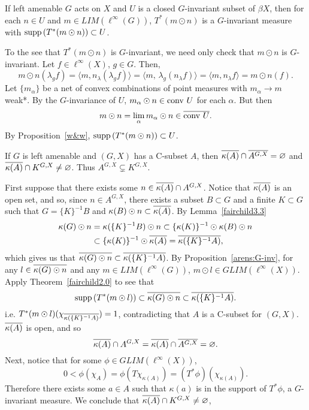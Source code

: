 \begin{theorem}\label{fairchild2.0}
If left amenable $G$ acts on $X$ and $U$ is a closed $G$-invariant
subset of $\beta X$, then for each $n\in U$ and $m\in LIM(\ell^\infty(G))$, $T^*(m\odot n)$
is a $G$-invariant measure with $\operatorname{supp\,} (T^*(m\odot n)) \subset U$.
\end{theorem}
\proof
To the see that $T^*(m\odot n)$ is $G$-invariant, we need only check that $m\odot n$ is
$G$-invariant.  Let $f\in \ell^\infty (X)$, $g\in G$.  Then,
\[
m\odot n(\lambda_g f) = \langle m, n_\lambda (\lambda_g f) \rangle = \langle m,\,\lambda_g(n_\lambda f) \rangle
= \langle m, n_\lambda f \rangle = m\odot n(f).
\]
Let $\{m_\alpha\}$ be a net of convex combinations of point measures with $m_\alpha \rightarrow m$ weak*.
By the $G$-invariance of $U$, $m_\alpha \odot n \in \operatorname{conv\,} U$ for each $\alpha$.  But then
\[
m\odot n = \lim_\alpha m_\alpha \odot n \in \overline{\operatorname{conv\,} U}.
\]
By Proposition~\ref{w&w}, $\operatorname{supp\,}(T^*(m\odot n)) \subset U$.
\done

\begin{theorem}
If $G$ is left amenable and $(G,X)$ has a C-subset $A$, then $\overline{\kappa(A)}\cap\overline{A^{G,X}} = \varnothing$ and
$\overline{\kappa(A)}\cap K^{G,X} \neq \varnothing$.  Thus $A^{G,X} \subsetneq K^{G,X}$.
\end{theorem}
\proof
First suppose that there exists some $n \in \overline{\kappa(A)}\cap A^{G,X}$.  Notice that $\overline{\kappa(A)}$
is an open set, and so, since $n\in A^{G,X}$, there exists a subset $B\subset G$ and a
finite $K\subset G$ such that $G=\{K\}^{-1}B$ and $\kappa(B) \odot n \subset \overline{\kappa(A)}$.
By Lemma~\ref{fairchild3.3}
\begin{align*}
\kappa(G) \odot n &= \kappa(\{K\}^{-1}B) \odot n \subset \{\kappa(K)\}^{-1} \odot \kappa(B) \odot n\\
& \subset \{\kappa(K)\}^{-1} \odot \overline{\kappa(A)} = \overline{\kappa(\{K\}^{-1}A)},
\end{align*}
which gives us that $\overline{\kappa(G) \odot n} \subset \overline{\kappa(\{K\}^{-1}A)}$.
By Proposition~\ref{arens:G-inv}, for any  $l\in \overline{\kappa(G) \odot n}$ and any $m\in LIM(\ell^\infty(G))$,
$m\odot l \in GLIM(\ell^\infty(X))$.
Apply Theorem~\ref{fairchild2.0} to see that 
\[
\operatorname{supp\,}(T^*(m\odot l)) \subset \overline{\kappa(G) \odot n} \subset \overline{\kappa(\{K\}^{-1}A)}.
\]
i.e. $T^*(m\odot l) (\chi_{\overline{\kappa(\{K\}^{-1}A)}}) = 1$, contradicting that
$A$ is a C-subset for $(G,X)$.  $\overline{\kappa(A)}$ is open, and so
\[
\overline{\kappa(A)} \cap A^{G,X} = \overline{\kappa(A)} \cap \overline{A^{G,X}} = \varnothing.
\]
Next, notice that for some $\phi \in GLIM(\ell^\infty(X))$,
\[
0 < \phi(\chi_A) = \phi (T \chi_{\kappa(A)}) = (T^*\phi)(\chi_{\kappa(A)}).
\]
Therefore there exists some $a\in A$ such that $\kappa(a)$ is in the support of $T^*\phi$,
a $G$-invariant measure.  We conclude that $\overline{\kappa(A)} \cap K^{G,X} \neq \varnothing$,
\done

